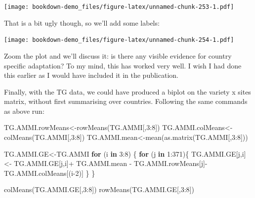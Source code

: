 \documentclass[
]{book}
\newenvironment{Shaded}{\begin{snugshade}}{\end{snugshade}}
\newcommand{\AttributeTok}[1]{\textcolor[rgb]{0.77,0.63,0.00}{#1}}
\newcommand{\ControlFlowTok}[1]{\textcolor[rgb]{0.13,0.29,0.53}{\textbf{#1}}}
\newcommand{\DecValTok}[1]{\textcolor[rgb]{0.00,0.00,0.81}{#1}}
\newcommand{\FloatTok}[1]{\textcolor[rgb]{0.00,0.00,0.81}{#1}}
\newcommand{\FunctionTok}[1]{\textcolor[rgb]{0.00,0.00,0.00}{#1}}
\newcommand{\NormalTok}[1]{#1}
\newcommand{\OtherTok}[1]{\textcolor[rgb]{0.56,0.35,0.01}{#1}}
\newcommand{\SpecialCharTok}[1]{\textcolor[rgb]{0.00,0.00,0.00}{#1}}
\newcommand{\StringTok}[1]{\textcolor[rgb]{0.31,0.60,0.02}{#1}}
\begin{document}
\texttt{[image: bookdown-demo\_files/figure-latex/unnamed-chunk-253-1.pdf]}

That is a bit ugly though, so we'll add some labels:

\begin{Shaded}
\end{Shaded}

\texttt{[image: bookdown-demo\_files/figure-latex/unnamed-chunk-254-1.pdf]}

Zoom the plot and we'll discuss it: is there any visible evidence for country specific adaptation? To my mind, this has worked very well. I wish I had done this earlier as I would have included it in the publication.

Finally, with the TG data, we could have produced a biplot on the variety x sites matrix, without first summarising over countries. Following the same commands as above run:

\begin{Shaded}
\begin{Highlighting}[]
\NormalTok{TG.AMMI.rowMeans}\OtherTok{\textless{}{-}}\FunctionTok{rowMeans}\NormalTok{(TG.AMMI[,}\DecValTok{3}\SpecialCharTok{:}\DecValTok{8}\NormalTok{])}
\NormalTok{TG.AMMI.colMeans}\OtherTok{\textless{}{-}}\FunctionTok{colMeans}\NormalTok{(TG.AMMI[,}\DecValTok{3}\SpecialCharTok{:}\DecValTok{8}\NormalTok{])}
\NormalTok{TG.AMMI.mean}\OtherTok{\textless{}{-}}\FunctionTok{mean}\NormalTok{(}\FunctionTok{as.matrix}\NormalTok{(TG.AMMI[,}\DecValTok{3}\SpecialCharTok{:}\DecValTok{8}\NormalTok{]))        }

\NormalTok{TG.AMMI.GE}\OtherTok{\textless{}{-}}\NormalTok{TG.AMMI}
 \ControlFlowTok{for}\NormalTok{ (i }\ControlFlowTok{in} \DecValTok{3}\SpecialCharTok{:}\DecValTok{8}\NormalTok{) \{}
   \ControlFlowTok{for}\NormalTok{ (j }\ControlFlowTok{in} \DecValTok{1}\SpecialCharTok{:}\DecValTok{371}\NormalTok{)\{ }
\NormalTok{     TG.AMMI.GE[j,i]}\OtherTok{\textless{}{-}}
\NormalTok{     TG.AMMI.GE[j,i]}\SpecialCharTok{+}\NormalTok{ TG.AMMI.mean }\SpecialCharTok{{-}}\NormalTok{ TG.AMMI.rowMeans[j]}\SpecialCharTok{{-}}\NormalTok{ TG.AMMI.colMeans[(i}\DecValTok{{-}2}\NormalTok{)]}
\NormalTok{     \}}
\NormalTok{ \}}

\FunctionTok{colMeans}\NormalTok{(TG.AMMI.GE[,}\DecValTok{3}\SpecialCharTok{:}\DecValTok{8}\NormalTok{])}
\FunctionTok{rowMeans}\NormalTok{(TG.AMMI.GE[,}\DecValTok{3}\SpecialCharTok{:}\DecValTok{8}\NormalTok{])}
\end{Highlighting}
\end{Shaded}
\end{document}
